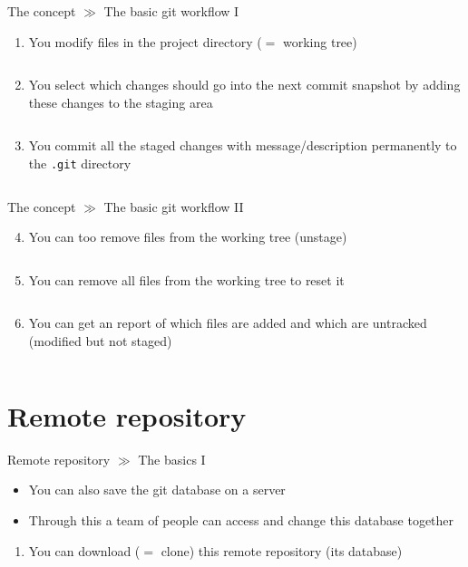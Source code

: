 \documentclass[10pt]{beamer}
\begin{document}
\begin{frame}{The concept $\gg$ The basic git workflow I}
\begin{enumerate}
	\item You modify files in the project directory ($=$ working tree) \\
	\inputminted[bgcolor=lightGreyCustom,fontsize=\scriptsize]{sh}{./resources/git_workflow_01_modify.sh}
	\item You select which changes should go into the next commit snapshot by adding these changes to the staging area \\
	\inputminted[bgcolor=lightGreyCustom,fontsize=\scriptsize]{sh}{./resources/git_workflow_02_stage.sh}
	\item You commit all the staged changes with message/description permanently to the \texttt{.git} directory \\
	\inputminted[bgcolor=lightGreyCustom,fontsize=\scriptsize]{sh}{./resources/git_workflow_03_commit.sh}
\end{enumerate}
\end{frame}

\begin{frame}{The concept $\gg$ The basic git workflow II}
\begin{enumerate}\setcounter{enumi}{3}
	\item You can too remove files from the working tree (unstage) \\
	\inputminted[bgcolor=lightGreyCustom,fontsize=\scriptsize]{sh}{./resources/git_workflow_04_unstage.sh}
	\item You can remove all files from the working tree to reset it\\
	\inputminted[bgcolor=lightGreyCustom,fontsize=\scriptsize]{sh}{./resources/git_workflow_05_reset.sh}
	\item You can get an report of which files are added and which are untracked (modified but not staged) \
	\inputminted[bgcolor=lightGreyCustom,fontsize=\scriptsize]{sh}{./resources/git_workflow_06_status.sh}
\end{enumerate}
\end{frame}

\section{Remote repository}

\begin{frame}{Remote repository $\gg$ The basics I}
\begin{itemize}
\item You can also save the git database on a server
\item Through this a team of people can access and change this database together
\end{itemize}
\begin{enumerate}
	\item You can download ($=$ clone) this remote repository (its database) \\
	\inputminted[bgcolor=lightGreyCustom,fontsize=\scriptsize]{sh}{./resources/git_remote_repository_01_clone.sh}
\end{enumerate}
\end{frame}
\end{document}

